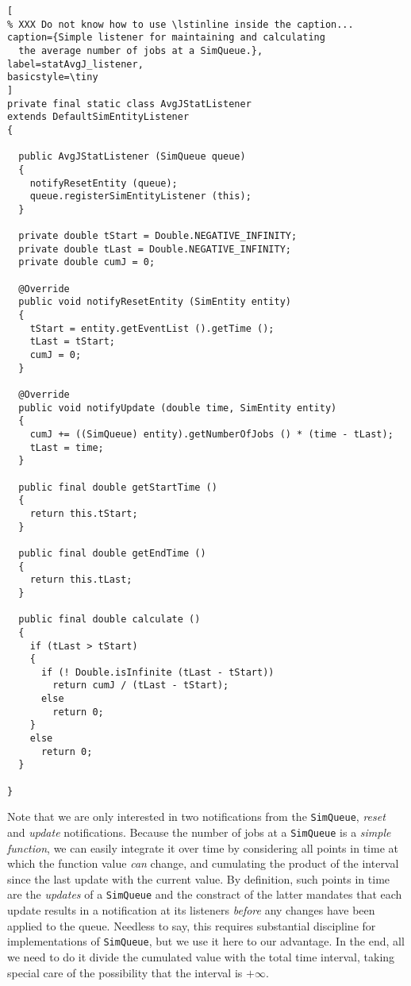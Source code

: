 \documentclass[12pt]{book}
\begin{document}
\begin{lstlisting}[
% XXX Do not know how to use \lstinline inside the caption...
caption={Simple listener for maintaining and calculating
  the average number of jobs at a SimQueue.},
label=statAvgJ_listener,
basicstyle=\tiny
]
private final static class AvgJStatListener
extends DefaultSimEntityListener
{
  
  public AvgJStatListener (SimQueue queue)
  {
    notifyResetEntity (queue);
    queue.registerSimEntityListener (this);
  }
    
  private double tStart = Double.NEGATIVE_INFINITY;
  private double tLast = Double.NEGATIVE_INFINITY;
  private double cumJ = 0;

  @Override
  public void notifyResetEntity (SimEntity entity)
  {
    tStart = entity.getEventList ().getTime ();
    tLast = tStart;
    cumJ = 0;
  }

  @Override
  public void notifyUpdate (double time, SimEntity entity)
  {
    cumJ += ((SimQueue) entity).getNumberOfJobs () * (time - tLast);
    tLast = time;
  }
      
  public final double getStartTime ()
  {
    return this.tStart;
  }
    
  public final double getEndTime ()
  {
    return this.tLast;
  }
    
  public final double calculate ()
  {
    if (tLast > tStart)
    {
      if (! Double.isInfinite (tLast - tStart))
        return cumJ / (tLast - tStart);
      else
        return 0;
    }
    else
      return 0;
  }

}
\end{lstlisting}

Note that we are only interested in two notifications from the \lstinline|SimQueue|,
  {\em reset\/} and {\em update\/} notifications.
Because the number of jobs at a \lstinline|SimQueue| is a {\em simple function},
  we can easily integrate it over time by considering all
  points in time at which the function value
  {\em can} change,
  and cumulating the product of the interval since the last update with the current value.
By definition, such points in time are the {\em updates\/} of a
  \lstinline|SimQueue| and the constract of the latter  mandates
  that each update results in a notification
  at its listeners {\em before\/} any changes have been applied to the queue.
Needless to say, this requires substantial discipline for implementations of \lstinline|SimQueue|,
  but we use it here to our advantage.
In the end, all we need to do it divide the cumulated value with
  the total time interval,
  taking special care of the possibility that the interval is $+\infty$.
\end{document}
